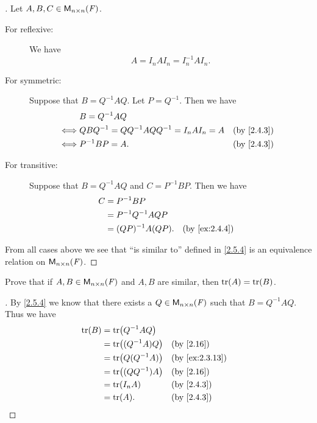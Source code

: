 \begin{proof}[]
	Let \(A, B, C \in \mathsf{M}_{{n} \times n}({\mathit{F}})\).
	\begin{description}
		\item[For reflexive:]
			We have
			\[
				A = I_n A I_n = I_n^{-1} A I_n.
			\]
		\item[For symmetric:]
			Suppose that \(B = Q^{-1} A Q\).
			Let \(P = Q^{-1}\).
			Then we have
			\begin{align*}
				     & B = Q^{-1} A Q                                                   \\
				\iff & Q B Q^{-1} = Q Q^{-1} A Q Q^{-1} = I_n A I_n = A &  & \by{2.4.3} \\
				\iff & P^{-1} B P = A.                                  &  & \by{2.4.3}
			\end{align*}
		\item[For transitive:]
			Suppose that \(B = Q^{-1} A Q\) and \(C = P^{-1} B P\).
			Then we have
			\begin{align*}
				C & = P^{-1} B P                             \\
				  & = P^{-1} Q^{-1} A Q P                    \\
				  & = (QP)^{-1} A (QP).   &  & \by{ex:2.4.4}
			\end{align*}
	\end{description}
	From all cases above we see that ``is similar to'' defined in \cref{2.5.4} is an equivalence relation on \(\mathsf{M}_{{n} \times n}({\mathit{F}})\).
\end{proof}

\begin{ex}\label{ex:2.5.10}
	Prove that if \(A, B \in \mathsf{M}_{{n} \times n}({\mathit{F}})\) and \(A, B\) are similar, then \(\tr[A] = \tr[B]\).
\end{ex}

\begin{proof}[]
	By \cref{2.5.4} we know that there exists a \(Q \in \mathsf{M}_{{n} \times n}({\mathit{F}})\) such that \(B = Q^{-1} A Q\).
	Thus we have
	\begin{align*}
		\tr[B] & = \tr[Q^{-1} A Q]                       \\
		       & = \tr[(Q^{-1} A) Q] &  & \by{2.16}      \\
		       & = \tr[Q (Q^{-1} A)] &  & \by{ex:2.3.13} \\
		       & = \tr[(Q Q^{-1}) A] &  & \by{2.16}      \\
		       & = \tr[I_n A]        &  & \by{2.4.3}     \\
		       & = \tr[A].           &  & \by{2.4.3}
	\end{align*}
\end{proof}

